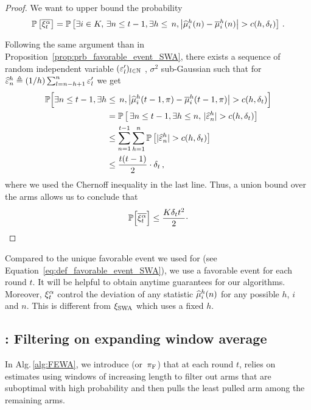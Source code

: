 \begin{proof}
We want to upper bound the probability
\[
\PP{\bar{\HPevent}} = \PP{\exists i \in K,\,\exists n \leq t-1, \exists h \leq\, n, \big|\hmu^h_i(n)-\bmu^h_i(n)\big|>c(h,\delta_t) }\,.
\]

Following the same argument than in Proposition~\ref{prop:prb_favorable_event_SWA}, there exists a sequence of random independent variable $(\varepsilon'_l)_{l\in{\mathbb N}}$ , $\sigma^2$ sub-Gaussian such that for $\widehat{\varepsilon}^h_n \triangleq (1/h) \sum_{l=n-h+1}^n \varepsilon'_l$ we get 
\begin{align*}
    \PPv\Big[\exists n \leq t-1, \exists h &\leq\, n, \big|\hmu^h_i(t-1,\pi)-\bmu^h_i(t-1,\pi)\big|>c(h,\delta_t) \Big]\\
    &= \PP{\,\exists n \leq t-1, \exists h \leq n,\, |\hepsilon^h_n|>c(h,\delta_t) }\\
    &\leq \sum_{n=1}^{t-1}\sum_{h=1}^n \PP{|\hepsilon^h_n|>c(h,\delta_t)} \\
    &\leq  \frac{t(t-1)}{2}\cdot \delta_t \,,
\end{align*}
where we used the Chernoff inequality in the last line. Thus, a union bound  over the arms allows us to conclude that
\[
\mathbb{P} \Big[\overline{\xi^\alpha_t}\Big]\leq \frac{K \delta_t t^2}{2}\cdot
\]
\end{proof}
\begin{remark}
Compared to the unique favorable event we used for \SWA (see Equation~\ref{eq:def_favorable_event_SWA}), we use a favorable event for each round $t$. It will be helpful to obtain anytime guarantees for our algorithms. Moreover, $\xi^\alpha_t$ control the deviation of any statistic $\widehat{\mu}_i^h(n)$ for any possible $h$, $i$ and $n$. This is different from $\xi_{\rm SWA}$ which uses a fixed $h$. 
\end{remark}

\subsection{{\FEWA}: Filtering on expanding window average}

 In Alg.\,\ref{alg:FEWA}, we introduce \FEWA (or~$\pi_{\rm F}$) that at each round $t$, relies on estimates using windows of increasing length to filter out arms that are suboptimal with high probability and then pulls the least pulled arm among the remaining arms. 
 
